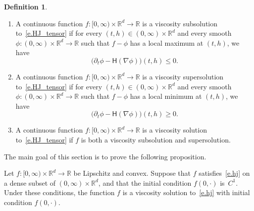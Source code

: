 \documentclass[10pt]{amsart}
\theoremstyle{definition}\newtheorem{defi}[theo]{Definition}\newtheorem{rema}[theo]{Remark}\newtheorem{exam}[theo]{Example}\newtheorem{exem}[theo]{Example}\newtheorem{nota}[theo]{Notation}
\newcommand{\R}{\mathbb{R}}
\newcommand{\Rd}{{\mathbb{R}^d}}
\renewcommand{\H}{\mathsf{H}}
\renewcommand{\leq}{\leqslant}
\renewcommand{\geq}{\geqslant}
\begin{document}
\begin{defi}
\leavevmode
\begin{enumerate}
\item\label{defiA.1.1} A continuous function $f:[0,\infty)\times \R^d\to \R$ is a viscosity subsolution to~\eqref{e.HJ_tensor} if for every $(t,h) \in (0,\infty)\times \R^d $ and every smooth $\phi:(0,\infty)\times \R^d\to \R$ such that $f-\phi$ has a local maximum at $(t,h)$, we have
\[
\big(\partial_t \phi - \H(\nabla\phi)\big)(t,h)\leq 0.
\]


\item\label{defiA.1.2} A continuous function $f:[0,\infty)\times \R^d\to \R$ is a viscosity supersolution to~\eqref{e.HJ_tensor} if for every $(t,h) \in (0,\infty)\times \R^d$ and every smooth $\phi:(0,\infty)\times \R^d \to \R$ such that $f-\phi$ has a local minimum at $(t,h)$, we have
\[
\big(\partial_t \phi - \H(\nabla\phi)\big)(t,h)\geq 0.
\]

\item\label{defiA.1.3} A continuous function $f:[0,\infty)\times \R^d\to \R$ is a viscosity solution to~\eqref{e.HJ_tensor} if $f$ is both a viscosity subsolution and supersolution.
\end{enumerate}
\end{defi}

The main goal of this section is to prove the following proposition.
\begin{prop}\label{p.weak}
Let $f : [0,\infty) \times \R^d \to \R$ be Lipschitz and convex. Suppose that $f$ satisfies~\eqref{e.hj} on a dense subset of $(0,\infty) \times \Rd$, and that the initial condition $f(0,\cdot)$ is~$C^1$. Under these conditions, the function $f$ is a viscosity solution to~\eqref{e.hj} with initial condition $f(0,\cdot)$.
\end{prop}
\end{document}
